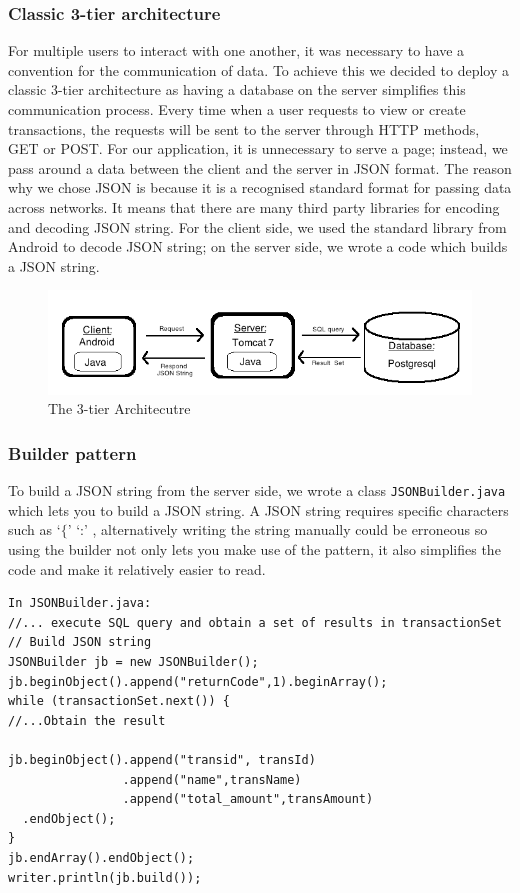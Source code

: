 \documentclass[a4paper,11pt]{article}
\begin{document}
\subsubsection*{Classic 3-tier architecture}
For multiple users to interact with one another, it was necessary to have a convention for the communication of data. To achieve this we decided to deploy a classic 3-tier architecture as having a database on the server simplifies this communication process. Every time when a user requests to view or create transactions, the requests will be sent to the server through HTTP methods, GET or POST. For our application, it is unnecessary to serve a page; instead, we pass around a data between the client and the server in JSON format. The reason why we chose JSON is because it is a recognised standard format for passing data across networks. It means that there are many third party libraries for encoding and decoding JSON string. For the client side, we used the standard library from Android to decode JSON string; on the server side, we wrote a code which builds a JSON string. 

\begin{figure}[ht]
\begin{center}
\advance\leftskip-3cm
\advance\rightskip-3cm
\includegraphics[keepaspectratio=true,scale=0.5]{3tier}
\caption{The 3-tier Architecutre}
\label{visina8}
\end{center}
\end{figure}

\subsubsection*{Builder pattern}
To build a JSON string from the server side, we wrote a class \texttt{JSONBuilder.java} which lets you to build a JSON string. A JSON string requires specific characters such as `$\lbrace$' `:' , alternatively writing the string manually could be erroneous so using the builder not only lets you make use of the pattern, it also simplifies the code and make it relatively easier to read. 

\begin{verbatim}
In JSONBuilder.java:
//... execute SQL query and obtain a set of results in transactionSet
// Build JSON string
JSONBuilder jb = new JSONBuilder();
jb.beginObject().append("returnCode",1).beginArray();
while (transactionSet.next()) {
//...Obtain the result
						
jb.beginObject().append("transid", transId)
                .append("name",transName)
                .append("total_amount",transAmount)
  .endObject();
}
jb.endArray().endObject();			
writer.println(jb.build());
\end{verbatim}
\end{document}
